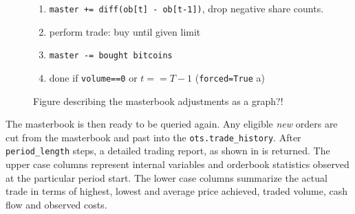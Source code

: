 \begin{figure}[ht]
	\centering
	\begin{enumerate}
	\item \lstinline!master += diff(ob[t] - ob[t-1])!, drop negative share counts.
	\item perform trade: buy until given limit
	\item \lstinline!master -= bought bitcoins!
	\item done if \lstinline!volume==0! or $t==T-1$ (\lstinline!forced=True! a)
	\end{enumerate}
	\caption{Figure describing the masterbook adjustments as a graph?!}
	\label{fig:masterbookadjustments}
\end{figure}

The masterbook is then ready to be queried again. Any eligible \emph{new} orders are cut from the masterbook and past into the \lstinline!ots.trade_history!. After \lstinline!period_length! steps, a detailed trading report, as shown in  is returned. The upper case columns represent internal variables and orderbook statistics observed at the particular period start. The lower case columns summarize the actual trade in terms of highest, lowest and average price achieved, traded volume, cash flow and observed costs.\\

\begin{table}
\centering
{}
\caption{Trading history, as returned after four consecutive calls of \lstinline!ots.trade()!.}
\label{tab:tradinghistory}
\end{table}

